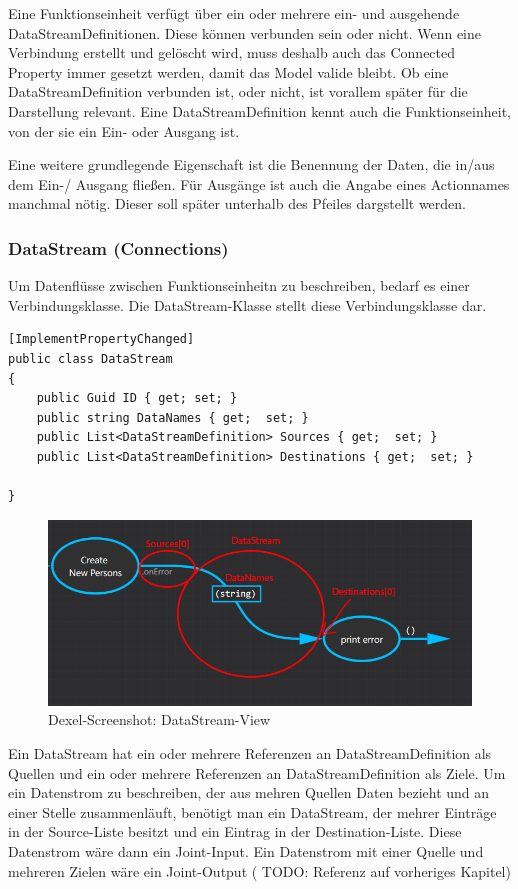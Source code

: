 	Eine Funktionseinheit verfügt über ein oder mehrere ein- und ausgehende
	DataStreamDefinitionen. Diese können verbunden sein oder nicht. Wenn eine
	Verbindung erstellt und gelöscht wird, muss deshalb auch das Connected
	Property immer gesetzt werden, damit das Model valide bleibt.
	Ob eine DataStreamDefinition verbunden ist, oder nicht, ist vorallem später
	für die Darstellung relevant.
	Eine DataStreamDefinition kennt auch die Funktionseinheit, von der sie ein
	Ein- oder Ausgang ist.
	
	Eine weitere grundlegende Eigenschaft ist die Benennung der Daten, die in/aus
	dem Ein-/ Ausgang fließen. Für Ausgänge ist auch die Angabe eines
	Actionnames manchmal nötig. Dieser soll später unterhalb des Pfeiles
	dargstellt werden.


\subsubsection{DataStream (Connections)}

Um Datenflüsse zwischen Funktionseinheitn zu beschreiben, bedarf es einer
Verbindungsklasse. Die DataStream-Klasse stellt diese Verbindungsklasse dar.


\begin{lstlisting}[caption=DataStream]
[ImplementPropertyChanged]
public class DataStream
{
	public Guid ID { get; set; }
	public string DataNames { get;  set; }
	public List<DataStreamDefinition> Sources { get;  set; }
	public List<DataStreamDefinition> Destinations { get;  set; }

}
\end{lstlisting}

		\begin{figure}[H]
			\centering
			\includegraphics[width=0.9\linewidth]{./img/DataStreamView.png} 
			\caption{Dexel-Screenshot: DataStream-View}
		\end{figure}


Ein DataStream hat ein oder mehrere Referenzen an DataStreamDefinition als
Quellen und ein oder mehrere Referenzen an DataStreamDefinition als Ziele.
Um ein Datenstrom zu beschreiben, der aus mehren Quellen Daten bezieht und
an einer Stelle zusammenläuft, benötigt man ein DataStream, der mehrer
Einträge in der Source-Liste besitzt und ein Eintrag in der
Destination-Liste. Diese Datenstrom wäre dann ein Joint-Input.
Ein Datenstrom mit einer Quelle und mehreren Zielen wäre ein Joint-Output ( TODO:
Referenz auf vorheriges Kapitel)

